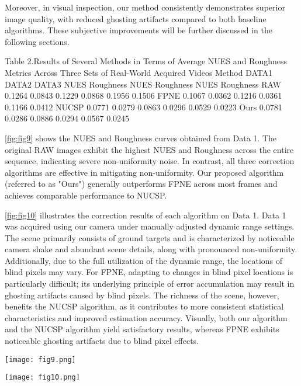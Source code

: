 \documentclass[a4paper,fleqn]{cas-dc}
\begin{document}
Moreover, in visual inspection, our method consistently demonstrates superior image quality, with reduced ghosting artifacts compared to both baseline algorithms. These subjective improvements will be further discussed in the following sections.

Table 2.Results of Several Methods in Terms of Average NUES and Roughness Metrics Across Three Sets of Real-World Acquired Videos
Method	DATA1	DATA2	DATA3
	NUES	Roughness	NUES	Roughness	NUES	Roughness
RAW	0.1264	0.0843	0.1229	0.0868	0.1956	0.1506
FPNE	0.1067	0.0362	0.1216	0.0361	0.1166	0.0412
NUCSP	0.0771	0.0279	0.0863	0.0296	0.0529	0.0223
Ours	0.0781	0.0286	0.0886	0.0294	0.0567	0.0245

\cref{fig:fig9} shows the NUES and Roughness curves obtained from Data 1. The original RAW images exhibit the highest NUES and Roughness across the entire sequence, indicating severe non-uniformity noise. In contrast, all three correction algorithms are effective in mitigating non-uniformity. Our proposed algorithm (referred to as "Ours") generally outperforms FPNE across most frames and achieves comparable performance to NUCSP.

\cref{fig:fig10} illustrates the correction results of each algorithm on Data 1. Data 1 was acquired using our camera under manually adjusted dynamic range settings. The scene primarily consists of ground targets and is characterized by noticeable camera shake and abundant scene details, along with pronounced non-uniformity. Additionally, due to the full utilization of the dynamic range, the locations of blind pixels may vary. For FPNE, adapting to changes in blind pixel locations is particularly difficult; its underlying principle of error accumulation may result in ghosting artifacts caused by blind pixels. The richness of the scene, however, benefits the NUCSP algorithm, as it contributes to more consistent statistical characteristics and improved estimation accuracy. Visually, both our algorithm and the NUCSP algorithm yield satisfactory results, whereas FPNE exhibits noticeable ghosting artifacts due to blind pixel effects.

   \begin{figure*}[ht]
    \centering
    \texttt{[image: fig9.png]}
    \caption{NUES and Roughness Curves for Different Processing Algorithm Results on Data 1.(a) NUES Curve (b) Roughness Curve}
    \label{fig:fig9}
\end{figure*}


  \begin{figure*}[ht]
    \centering
    \texttt{[image: fig10.png]}
    \caption{Processed Images of Data 1 at Frames 1, 100, 200, 300, 400, and 500. (a)Raw images with true FPN;(b)FPNE\citep{liu_fpn_2019};(c)NUCSP\citep{dandan_nonuniformity_2024};(d)Ours  }
    \label{fig:fig10}
\end{figure*}
 
\end{document}
